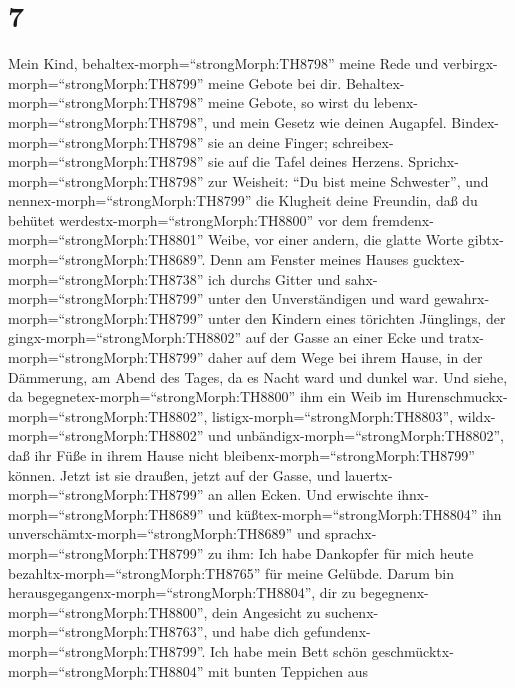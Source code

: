 \hypertarget{section-6}{%
\section{7}\label{section-6}}

 Mein Kind, behaltex-morph=``strongMorph:TH8798'' meine Rede
und verbirgx-morph=``strongMorph:TH8799'' meine Gebote bei dir.
 Behaltex-morph=``strongMorph:TH8798'' meine Gebote, so
wirst du lebenx-morph=``strongMorph:TH8798'', und mein Gesetz wie deinen
Augapfel.  Bindex-morph=``strongMorph:TH8798'' sie an deine
Finger; schreibex-morph=``strongMorph:TH8798'' sie auf die Tafel deines
Herzens.  Sprichx-morph=``strongMorph:TH8798'' zur Weisheit:
``Du bist meine Schwester'', und nennex-morph=``strongMorph:TH8799'' die
Klugheit deine Freundin,  daß du behütet
werdestx-morph=``strongMorph:TH8800'' vor dem
fremdenx-morph=``strongMorph:TH8801'' Weibe, vor einer andern, die
glatte Worte gibtx-morph=``strongMorph:TH8689''.  Denn am
Fenster meines Hauses gucktex-morph=``strongMorph:TH8738'' ich durchs
Gitter  und sahx-morph=``strongMorph:TH8799'' unter den
Unverständigen und ward gewahrx-morph=``strongMorph:TH8799'' unter den
Kindern eines törichten Jünglings,  der
gingx-morph=``strongMorph:TH8802'' auf der Gasse an einer Ecke und
tratx-morph=``strongMorph:TH8799'' daher auf dem Wege bei ihrem Hause,
 in der Dämmerung, am Abend des Tages, da es Nacht ward und
dunkel war.  Und siehe, da
begegnetex-morph=``strongMorph:TH8800'' ihm ein Weib im
Hurenschmuckx-morph=``strongMorph:TH8802'',
listigx-morph=``strongMorph:TH8803'', 
wildx-morph=``strongMorph:TH8802'' und
unbändigx-morph=``strongMorph:TH8802'', daß ihr Füße in ihrem Hause
nicht bleibenx-morph=``strongMorph:TH8799'' können.  Jetzt
ist sie draußen, jetzt auf der Gasse, und
lauertx-morph=``strongMorph:TH8799'' an allen Ecken.  Und
erwischte ihnx-morph=``strongMorph:TH8689'' und
küßtex-morph=``strongMorph:TH8804'' ihn
unverschämtx-morph=``strongMorph:TH8689'' und
sprachx-morph=``strongMorph:TH8799'' zu ihm:  Ich habe
Dankopfer für mich heute bezahltx-morph=``strongMorph:TH8765'' für meine
Gelübde.  Darum bin
herausgegangenx-morph=``strongMorph:TH8804'', dir zu
begegnenx-morph=``strongMorph:TH8800'', dein Angesicht zu
suchenx-morph=``strongMorph:TH8763'', und habe dich
gefundenx-morph=``strongMorph:TH8799''.  Ich habe mein Bett
schön geschmücktx-morph=``strongMorph:TH8804'' mit bunten Teppichen aus
